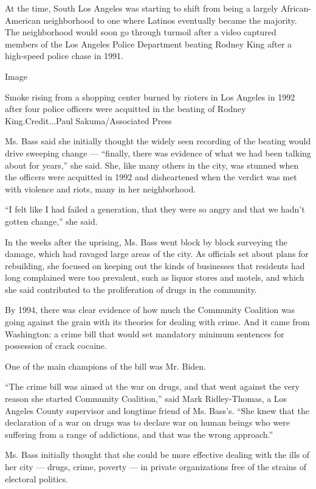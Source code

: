 At the time, South Los Angeles was starting to shift from being a
largely African-American neighborhood to one where Latinos eventually
became the majority. The neighborhood would soon go through turmoil
after a video captured members of the Los Angeles Police Department
beating Rodney King after a high-speed police chase in 1991.

Image

Smoke rising from a shopping center burned by rioters in Los Angeles in
1992 after four police officers were acquitted in the beating of Rodney
King.Credit...Paul Sakuma/Associated Press

Ms. Bass said she initially thought the widely seen recording of the
beating would drive sweeping change --- ``finally, there was evidence of
what we had been talking about for years,'' she said. She, like many
others in the city, was stunned when the officers were acquitted in 1992
and disheartened when the verdict was met with violence and riots, many
in her neighborhood.

``I felt like I had failed a generation, that they were so angry and
that we hadn't gotten change,'' she said.

In the weeks after the uprising, Ms. Bass went block by block surveying
the damage, which had ravaged large areas of the city. As officials set
about plans for rebuilding, she focused on keeping out the kinds of
businesses that residents had long complained were too prevalent, such
as liquor stores and motels, and which she said contributed to the
proliferation of drugs in the community.

By 1994, there was clear evidence of how much the Community Coalition
was going against the grain with its theories for dealing with crime.
And it came from Washington: a crime bill that would set mandatory
minimum sentences for possession of crack cocaine.

One of the main champions of the bill was Mr. Biden.

``The crime bill was aimed at the war on drugs, and that went against
the very reason she started Community Coalition,'' said Mark
Ridley-Thomas, a Los Angeles County supervisor and longtime friend of
Ms. Bass's. ``She knew that the declaration of a war on drugs was to
declare war on human beings who were suffering from a range of
addictions, and that was the wrong approach.''

Ms. Bass initially thought that she could be more effective dealing with
the ills of her city --- drugs, crime, poverty --- in private
organizations free of the strains of electoral politics.

